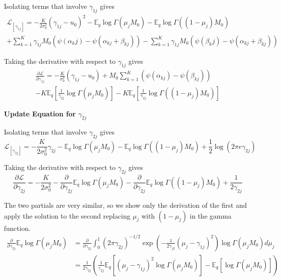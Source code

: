 \documentclass[10pt, letterpaper]{article}
\newcommand{\E}{\mathbb{E}}
\begin{document}
Isolating terms that involve $\gamma_{1j}$ gives
\begin{multline*}
\mathcal{L}_{[\gamma_{1j}]} = -\frac{K}{2\sigma_0^2}(\gamma_{1j}-u_0)^2 
-\E_q \log \Gamma(\mu_j M_0) -\E_q \log \Gamma((1-\mu_j)M_0) \\
+ \sum_{k=1}^K \gamma_{1j} M_0 ( \psi(\alpha_kj) - \psi(\alpha_{kj} + \beta_{kj}) )
- \sum_{k=1}^K \gamma_{1j} M_0 ( \psi(\beta_kj) - \psi(\alpha_{kj} + \beta_{kj}) )
\end{multline*}

Taking the derivative with respect to $\gamma_{1j}$  gives
\begin{multline}
\frac{\partial \mathcal{L}}{\partial \gamma_{1j}} = -\frac{K}{\sigma_0^2}(\gamma_{1j} - u_0) 
	+M_0 \sum_{k=1}^K \left( \psi(\alpha_{kj}) - \psi(\beta_{kj}) \right) \\
	-K \E_q \left[ \frac{1}{\gamma_{2j}} \log \Gamma(\mu_jM_0) \right]
	-K \E_q \left[ \frac{1}{\gamma_{2j}} \log \Gamma((1-\mu_j)M_0) \right]
\end{multline}

{\bf Update Equation for $\gamma_{2j}$ }\label{sec:gamma2_update}

Isolating terms that involve $\gamma_{2j}$ gives
\begin{equation*}
\mathcal{L}_{[\gamma_{2j}]} = -\frac{K}{2\sigma_0^2}\gamma_{2j} -\E_q\log\Gamma(\mu_jM_0) - \E_q\log\Gamma((1-\mu_j)M_0)+\frac{1}{2}\log(2\pi e \gamma_{2j})
\end{equation*}

Taking the derivative with respect to $\gamma_{2j}$ gives
\begin{equation}\label{eqn:gam2_deriv}
\frac{\partial \mathcal{L}}{\partial \gamma_{2j}} = -\frac{K}{2\sigma_0^2} -\frac{\partial}{\partial \gamma_{2j}}\E_q\log\Gamma(\mu_jM_0) -\frac{\partial}{\partial \gamma_{2j}}\E_q\log\Gamma((1-\mu_j)M_0) +\frac{1}{2\gamma_{2j}}
\end{equation}

The two partials are very similar, so we show only the derivation of the first and apply the solution to the second replacing $\mu_j$ with $(1-\mu_j)$ in the gamma function.
\begin{align}\label{eqn:gam2_int1}
\frac{\partial}{\partial \gamma_{2j}}\E_q\log\Gamma(\mu_jM_0) &= \frac{\partial}{\partial \gamma_{2j}} \int_0^1 (2\pi\gamma_{2j})^{-1/2}\exp\left(-\frac{1}{2\gamma_{j2}}(\mu_j-\gamma_{1j})^2\right) \log\Gamma(\mu_jM_0)d\mu_j \\
& = \frac{1}{2\gamma_{2j}}\left(\frac{1}{\gamma_{2j}} \E_q \left[ (\mu_j-\gamma_{1j})^2 \log\Gamma(\mu_jM_0) \right] - \E_q \left[ \log\Gamma(\mu_jM_0) \right] \right)
\end{align}
\end{document}

